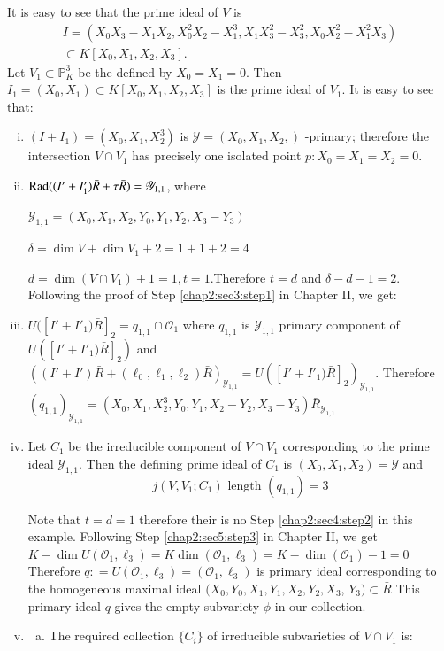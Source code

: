It is easy to see that the prime ideal of $V$ is 
\begin{multline*}
I=(X_0 X_3-X_1 X_2,X^2_0 X_2 - X_1^3, X_1 X^2_3 -X^2_3, X_0 X^2_2 -
X^2_1  X_3)\\ 
\subset K[X_0,X_1,X_2,X_3]. 
\end{multline*}
Let $V_1 \subset \mathbb{P}^3_K$ be the defined by $X_0 = X_1 =
0$. Then $I_1 = (X_0,X_1) \subset K[X_0, X_1, X_2, X_3]$ is the prime
ideal of $V_1$. It is  easy to see that: 
\begin{enumerate}[(i)]
\item $(I+I_1) = (X_0, X_1,X^3_2)$ is $\mathscr{Y} = (X_0, X_1, X_2,
  )$ -primary; therefore the intersection $V \cap V_1$ has precisely
  one isolated point $p:  X_0 = X_1 =  X_2 = 0 $. 
\item $\operatorname{Rad} ((I'+I'_1) \bar{R} + \tau \bar{R}) = \mathscr{Y}_{1,1}$, where

  $\mathscr{Y}_{1,1} = (X_0, X_1, X_2, Y_0, Y_1, Y_2, X_3 - Y_3)$

  $\delta = \dim V+ \dim V_1 + 2 = 1 + 1 + 2 = 4 $

  $d =\dim (V \cap V_1)+1 = 1, t=1$.\pageoriginale Therefore $t=d$ and $\delta-d-1
  =2$. Following the proof of Step \ref{chap2:sec3:step1} in Chapter
  II, we get:   
\item $U([I' + I'_1) \bar{R}]_2 = q_{1,1} \cap \mathscr{O}_1$ where
  $q_{1,1}$ is $\mathscr{Y}_{1,1}$ primary component of $U([I' + I'_1)
  \bar{R}]_2)$ and $((I' + I') \bar{R} + (\ell_0,\ell_1,\ell_2)
  \bar{R})_{\mathscr{Y}_{1,1}}= U([I' + I'_1)
    \bar{R}]_2)_{\mathscr{Y}_{1,1}}$. Therefore
  $(q_{1,1})_{\mathscr{Y}_{1,1}} = (X_0, X_1, X^3_2,
  Y_0,Y_1, X_2-Y_2, X_3-Y_3) \bar{R}_{\mathscr{Y}_{1,1}}$  
\item Let $C_1$ be the irreducible component of $V \cap V_1$
  corresponding to the prime ideal $ \mathscr{Y}_{1,1}$. Then the
  defining prime ideal of $C_1$ is $(X_0, X_1, X_2) = \mathscr{Y}$ and  
  $$
  j(V, V_1 ; C_1) \text{ length } (q_{1,1})=3
  $$

Note that $t = d =1$ therefore their is no Step \ref{chap2:sec4:step2} in this
example. Following  Step \ref{chap2:sec5:step3} in Chapter II, we get $K -\dim
U(\mathscr{O}_1, \ell_3) = K \dim  (\mathscr{O}_1, \ell_3) = K -\dim
(\mathscr{O}_1) -1 = 0$ Therefore $q:  = U (\mathscr{O}_1, \ell_3) =
(\mathscr{O}_1, \ell_3)$ is primary ideal corresponding to the
homogeneous maximal ideal $(X_0, Y_0, X_1, Y_1,X_2,Y_2,X_3$, $Y_3)
\subset \bar{R}$  This primary ideal $q$ gives the empty subvariety
$\phi$ in our collection.  
\item 
  \begin{enumerate}[(a)] 
    \item The required collection $\{C_i\}$ of irreducible
      subvarieties  of $V \cap V_1$ is:  


\end{enumerate}
\end{enumerate}
